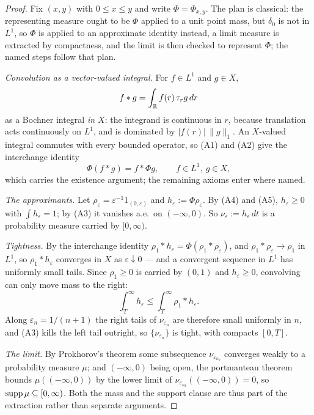 \begin{proof}
Fix $(x,y)$ with $0 \le x \le y$ and write $\Phi = \Phi_{x,y}$. The plan is classical:
the representing measure ought to be $\Phi$ applied to a unit point mass, but $\delta_0$
is not in $L^1$, so $\Phi$ is applied to an approximate identity instead, a limit measure
is extracted by compactness, and the limit is then checked to represent $\Phi$; the named
steps follow that plan.

\emph{Convolution as a vector-valued integral.} For $f \in L^1$ and $g \in X$,
\[
  f * g = \int_{\mathbb{R}} f(r)\,\tau_r g\,dr
\]
as a Bochner integral \emph{in $X$}: the integrand is continuous in $r$, because translation
acts continuously on $L^1$, and is dominated by $|f(r)|\,\|g\|_1$. An $X$-valued integral
commutes with every bounded operator, so (A1) and (A2) give the interchange identity
\[
  \Phi(f * g) = f * \Phi g, \qquad f \in L^1,\ g \in X,
\]
which carries the existence argument; the remaining axioms enter where named.

\emph{The approximants.} Let $\rho_\varepsilon = \varepsilon^{-1} 1_{(0,\varepsilon)}$ and
$h_\varepsilon := \Phi \rho_\varepsilon$. By (A4) and (A5), $h_\varepsilon \ge 0$ with
$\int h_\varepsilon = 1$; by (A3) it vanishes a.e.\ on $(-\infty,0)$. So
$\nu_\varepsilon := h_\varepsilon\,dt$ is a probability measure carried by $[0,\infty)$.

\emph{Tightness.} By the interchange identity
$\rho_1 * h_\varepsilon = \Phi(\rho_1 * \rho_\varepsilon)$, and
$\rho_1 * \rho_\varepsilon \to \rho_1$ in $L^1$, so $\rho_1 * h_\varepsilon$ converges in $X$
as $\varepsilon \downarrow 0$ --- and a convergent sequence in $L^1$ has uniformly small tails.
Since $\rho_1 \ge 0$ is carried by $(0,1)$ and $h_\varepsilon \ge 0$, convolving can only move
mass to the right:
\[
  \int_T^\infty h_\varepsilon \le \int_T^\infty \rho_1 * h_\varepsilon .
\]
Along $\varepsilon_n = 1/(n+1)$ the right tails of $\nu_{\varepsilon_n}$ are therefore small
uniformly in $n$, and (A3) kills the left tail outright, so
$\{\nu_{\varepsilon_n}\}$ is tight, with compacts $[0,T]$.

\emph{The limit.} By Prokhorov's theorem some subsequence $\nu_{\varepsilon_{n_k}}$ converges
weakly to a probability measure $\mu$; and $(-\infty,0)$ being open, the portmanteau theorem
bounds $\mu((-\infty,0))$ by the lower limit of $\nu_{\varepsilon_{n_k}}((-\infty,0)) = 0$, so
$\operatorname{supp} \mu \subseteq [0,\infty)$. Both the mass and the support clause are thus part of the
extraction rather than separate arguments.


\end{proof}
